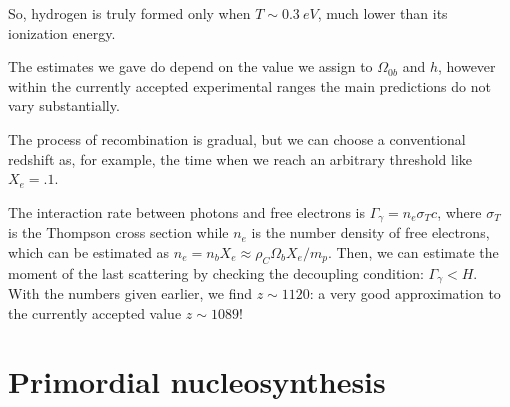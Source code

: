 \documentclass[main.tex]{subfiles}
\begin{document}
So, hydrogen is truly formed only when \(T \sim \SI{0.3}{eV}\), much lower than its ionization energy.


The estimates we gave do depend on the value we assign to \(\Omega_{0b}\) and \(h\), however within the currently accepted experimental ranges the main predictions do not vary substantially. 

The process of recombination is gradual, but we can choose a conventional redshift as, for example, the time when we reach an arbitrary threshold like \(X_e = \num{.1}\). 

The interaction rate between photons and free electrons is \(\Gamma_{\gamma } = n_e \sigma_T c\), where \(\sigma _T\) is the Thompson cross section while \(n_e\) is the number density of free electrons, which can be estimated as \(n_e = n_b X_e \approx \rho_C \Omega_{b} X_e / m_p\). 
Then, we can estimate the moment of the last scattering by checking the decoupling condition: \(\Gamma _\gamma < H\). 
With the numbers given earlier, we find \(z \sim 1120\): a very good approximation to the currently accepted value \(z \sim 1089\)!




\section{Primordial nucleosynthesis}
\end{document}

